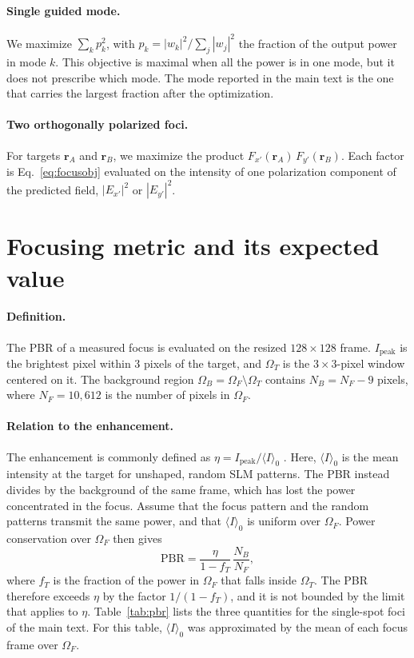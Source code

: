 \documentclass{article}
\begin{document}
\paragraph{Single guided mode.}
We maximize $\sum_k p_k^2$, with $p_k=|w_k|^2/\sum_j|w_j|^2$ the fraction of the output power in mode $k$.
This objective is maximal when all the power is in one mode, but it does not prescribe which mode.
The mode reported in the main text is the one that carries the largest fraction after the optimization.

\paragraph{Two orthogonally polarized foci.}
For targets $\mathbf{r}_A$ and $\mathbf{r}_B$, we maximize the product $F_{x'}(\mathbf{r}_A)\,F_{y'}(\mathbf{r}_B)$.
Each factor is Eq.~\eqref{eq:focusobj} evaluated on the intensity of one polarization component of the predicted field, $|E_{x'}|^2$ or $|E_{y'}|^2$.

\section{Focusing metric and its expected value}
\label{sec:pbr}
\paragraph{Definition.}
The PBR of a measured focus is evaluated on the resized $128\times128$ frame.
$I_{\mathrm{peak}}$ is the brightest pixel within 3 pixels of the target, and $\Omega_T$ is the $3\times3$-pixel window centered on it.
The background region $\Omega_B=\Omega_F\setminus\Omega_T$ contains $N_B=N_F-9$ pixels, where $N_F=10{,}612$ is the number of pixels in $\Omega_F$.

\paragraph{Relation to the enhancement.}
The enhancement is commonly defined as $\eta=I_{\mathrm{peak}}/\langle I\rangle_0$ \cite{focusing_coherent}.
Here, $\langle I\rangle_0$ is the mean intensity at the target for unshaped, random SLM patterns.
The PBR instead divides by the background of the same frame, which has lost the power concentrated in the focus.
Assume that the focus pattern and the random patterns transmit the same power, and that $\langle I\rangle_0$ is uniform over $\Omega_F$.
Power conservation over $\Omega_F$ then gives
\begin{equation}
\label{eq:pbr_eta}
\mathrm{PBR}=\frac{\eta}{1-f_T}\,\frac{N_B}{N_F},
\end{equation}
where $f_T$ is the fraction of the power in $\Omega_F$ that falls inside $\Omega_T$.
The PBR therefore exceeds $\eta$ by the factor $1/(1-f_T)$, and it is not bounded by the limit that applies to $\eta$.
Table~\ref{tab:pbr} lists the three quantities for the single-spot foci of the main text.
For this table, $\langle I\rangle_0$ was approximated by the mean of each focus frame over $\Omega_F$.
\end{document}
